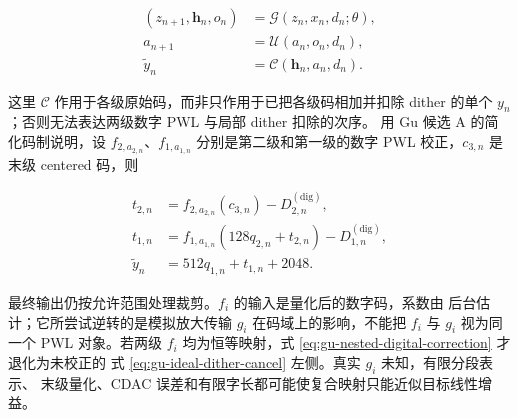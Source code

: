 \documentclass[11pt,a4paper]{ctexart}
\theoremstyle{adcplain}
\theoremstyle{definition}
\begin{document}
\begin{align}
  (z_{n+1},\mathbf h_n,o_n)
  &=\mathcal G(z_n,x_n,d_n;\theta), \label{eq:cal-plant}\\
  a_{n+1}
  &=\mathcal U(a_n,o_n,d_n), \label{eq:cal-update}\\
  \widetilde y_n
  &=\mathcal C(\mathbf h_n,a_n,d_n). \label{eq:cal-correction}
\end{align}

这里 $\mathcal C$ 作用于各级原始码，而非只作用于已把各级码相加并扣除
dither 的单个 $y_n$；否则无法表达两级数字 PWL 与局部 dither 扣除的次序。
用 Gu 候选 A 的简化码制说明，设 $f_{2,a_{2,n}}$、$f_{1,a_{1,n}}$
分别是第二级和第一级的数字 PWL 校正，$c_{3,n}$ 是末级 centered 码，则

\begin{align}
  t_{2,n}&=f_{2,a_{2,n}}(c_{3,n})-D_{2,n}^{(\mathrm{dig})},\\
  t_{1,n}&=f_{1,a_{1,n}}(128q_{2,n}+t_{2,n})
              -D_{1,n}^{(\mathrm{dig})},\\
  \widetilde y_n&=512q_{1,n}+t_{1,n}+2048.
  \label{eq:gu-nested-digital-correction}
\end{align}

最终输出仍按允许范围处理裁剪。$f_i$ 的输入是量化后的数字码，系数由
后台估计；它所尝试逆转的是模拟放大传输 $g_i$ 在码域上的影响，不能把
$f_i$ 与 $g_i$ 视为同一个 PWL 对象。若两级 $f_i$ 均为恒等映射，式
\eqref{eq:gu-nested-digital-correction} 才退化为未校正的
式 \eqref{eq:gu-ideal-dither-cancel} 左侧。真实 $g_i$ 未知，有限分段表示、
末级量化、CDAC 误差和有限字长都可能使复合映射只能近似目标线性增益。

\begin{center}
\end{center}
\end{document}
